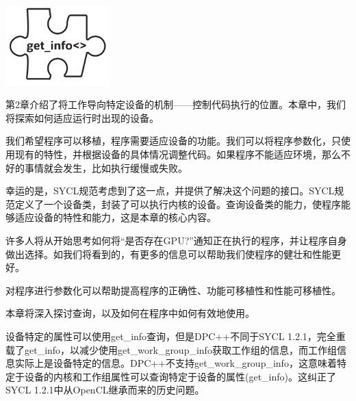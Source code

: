 \begin{center}
	\includegraphics[width=0.3\textwidth]{content/chapter-12/images/1}
\end{center}

第2章介绍了将工作导向特定设备的机制——控制代码执行的位置。本章中，我们将探索如何适应运行时出现的设备。\par

我们希望程序可以移植，程序需要适应设备的功能。我们可以将程序参数化，只使用现有的特性，并根据设备的具体情况调整代码。如果程序不能适应环境，那么不好的事情就会发生，比如执行缓慢或失败。\par

幸运的是，SYCL规范考虑到了这一点，并提供了解决这个问题的接口。SYCL规范定义了一个设备类，封装了可以执行内核的设备。查询设备类的能力，使程序能够适应设备的特性和能力，这是本章的核心内容。\par

许多人将从开始思考如何将“是否存在GPU?”通知正在执行的程序，并让程序自身做出选择。如我们将看到的，有更多的信息可以帮助我们使程序的健壮和性能更好。\par

\begin{tcolorbox}[colback=red!5!white,colframe=red!75!black]
对程序进行参数化可以帮助提高程序的正确性、功能可移植性和性能可移植性。
\end{tcolorbox}

本章将深入探讨查询，以及如何在程序中如何有效地使用。\par

设备特定的属性可以使用get\_info查询，但是DPC++不同于SYCL 1.2.1，完全重载了get\_info，以减少使用get\_work\_group\_info获取工作组的信息，而工作组信息实际上是设备特定的信息。DPC++不支持get\_work\_group\_info，这意味着特定于设备的内核和工作组属性可以查询特定于设备的属性(get\_info)。这纠正了SYCL 1.2.1中从OpenCL继承而来的历史问题。\par

















































